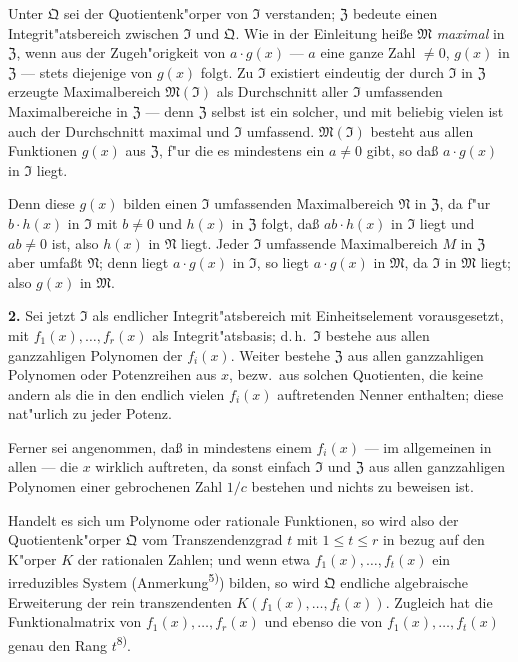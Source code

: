Unter $\mathfrak{Q}$ sei der Quotientenk"orper von $\mathfrak{I}$ verstanden; $\mathfrak{Z}$ bedeute einen Integrit"atsbereich zwischen $\mathfrak{I}$ und $\mathfrak{Q}$. Wie in der Einleitung hei\ss e $\mathfrak{M}$ \textit{maximal} in $\mathfrak{Z}$, wenn aus der Zugeh"origkeit von $a \cdot g(x)$ --- $a$ eine ganze Zahl $\neq 0$, $g(x)$ in $\mathfrak{Z}$ --- stets diejenige von $g(x)$ folgt. Zu $\mathfrak{I}$ existiert eindeutig der durch $\mathfrak{I}$ in $\mathfrak{Z}$ erzeugte Maximalbereich $\mathfrak{M}(\mathfrak{I})$ als Durchschnitt aller $\mathfrak{I}$ umfassenden Maximalbereiche in $\mathfrak{Z}$ --- denn $\mathfrak{Z}$ selbst ist ein solcher, und mit beliebig vielen ist auch der Durchschnitt maximal und $\mathfrak{I}$ umfassend. $\mathfrak{M}(\mathfrak{I})$ besteht aus allen Funktionen $g(x)$ aus $\mathfrak{Z}$, f"ur die es mindestens ein $a \neq 0$ gibt, so da\ss{} $a \cdot g(x)$ in $\mathfrak{I}$ liegt.

Denn diese $g(x)$ bilden einen $\mathfrak{I}$ umfassenden Maximalbereich $\mathfrak{N}$ in $\mathfrak{Z}$, da f"ur $b \cdot h(x)$ in $\mathfrak{I}$ mit $b \neq 0$ und $h(x)$ in $\mathfrak{Z}$ folgt, da\ss{} $ab \cdot h(x)$ in $\mathfrak{I}$ liegt und $ab \neq 0$ ist, also $h(x)$ in $\mathfrak{N}$ liegt. Jeder $\mathfrak{I}$ umfassende Maximalbereich $M$ in $\mathfrak{Z}$ aber umfa\ss t $\mathfrak{N}$; denn liegt $a \cdot g(x)$ in $\mathfrak{I}$, so liegt $a \cdot g(x)$ in $\mathfrak{M}$, da $\mathfrak{I}$ in $\mathfrak{M}$ liegt; also $g(x)$ in $\mathfrak{M}$.

\medskip\noindent\textbf{2.}
Sei jetzt $\mathfrak{I}$ als endlicher Integrit"atsbereich mit Einheitselement vorausgesetzt, mit $f_1(x),\ldots,f_r(x)$ als Integrit"atsbasis; d.\,h.\ $\mathfrak{I}$ bestehe aus allen ganzzahligen Polynomen der $f_i(x)$. Weiter bestehe $\mathfrak{Z}$ aus allen ganzzahligen Polynomen oder Potenzreihen aus $x$, bezw.\ aus solchen Quotienten, die keine andern als die in den endlich vielen $f_i(x)$ auftretenden Nenner enthalten; diese nat"urlich zu jeder Potenz.

Ferner sei angenommen, da\ss{} in mindestens einem $f_i(x)$ --- im allgemeinen in allen --- die $x$ wirklich auftreten, da sonst einfach $\mathfrak{I}$ und $\mathfrak{Z}$ aus allen ganzzahligen Polynomen einer gebrochenen Zahl $1/c$ bestehen und nichts zu beweisen ist.

Handelt es sich um Polynome oder rationale Funktionen, so wird also der Quotientenk"orper $\mathfrak{Q}$ vom Transzendenzgrad $t$ mit $1 \leq t \leq r$ in bezug auf den K"orper $K$ der rationalen Zahlen; und wenn etwa $f_1(x),\ldots,f_t(x)$ ein irreduzibles System (Anmerkung\textsuperscript{5)}) bilden, so wird $\mathfrak{Q}$ endliche algebraische Erweiterung der rein transzendenten $K(f_1(x),\ldots,f_t(x))$. Zugleich hat die Funktionalmatrix von $f_1(x),\ldots,f_r(x)$ und ebenso die von $f_1(x),\ldots,f_t(x)$ genau den Rang $t$\textsuperscript{8)}.

